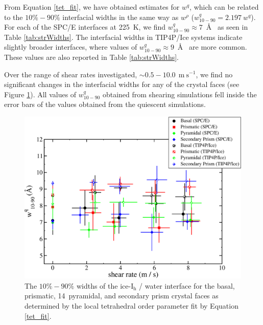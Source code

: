 From Equation \eqref{tet_fit}, we have obtained estimates for $w^{q}$,
which can be related to the $10\%-90\%$ interfacial widths in the same
way as $w^{\rho}$
($w_\mathrm{10-90}^{q} = 2.197~w^{q}$).\cite{Bryk2002,Bryk2004} For
each of the SPC/E interfaces at 225~K, we find
$w_\mathrm{10-90}^{q} \approx 7$~\AA~ as seen in Table
\ref{tab:strWidths}. The interfacial widths in TIP4P/Ice systems
indicate slightly broader interfaces, where values of
$w_\mathrm{10-90}^{q} \approx 9$~\AA~ are more common. These values
are also reported in Table \ref{tab:strWidths}. 

Over the range of shear rates investigated,
$\sim 0.5-10.0~\mathrm{~m~s}^{-1}$, we find no significant changes in
the interfacial widths for any of the crystal faces (see Figure \ref{fig:tetByShearRate}). All values of
$w_\mathrm{10-90}^{q}$ obtained from shearing simulations fell inside the
error bars of the values obtained from the quiescent simulations.

\begin{figure}
\includegraphics[width=\linewidth]{Figures/tetByShearRate}
\caption{\label{fig:tetByShearRate}The $10\%-90\%$ widths of the
  ice-I$_\mathrm{h}$ / water interface for the basal, prismatic,
  14\degree~pyramidal, and secondary prism crystal faces as determined
  by the local tetrahedral order parameter fit by
  Equation \eqref{tet_fit}.}
\end{figure}


